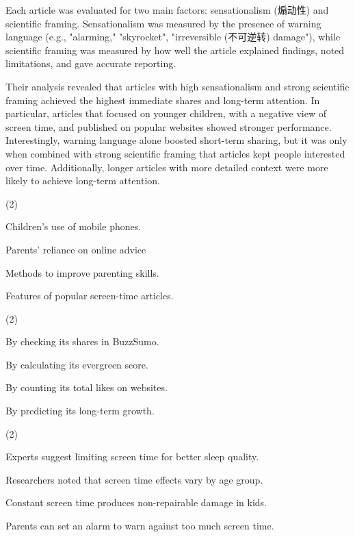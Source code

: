 \documentclass{英语试卷}
\begin{document}
\par Each article was evaluated for two main factors: sensationalism (煽动性) and scientific framing. Sensationalism was measured by the presence of warning language (e.g., "alarming," "skyrocket", "irreversible (不可逆转) damage"), while scientific framing was measured by how well the article explained findings, noted limitations, and gave accurate reporting.\par
\par Their analysis revealed that articles with high sensationalism and strong scientific framing achieved the highest immediate shares and long-term attention. In particular, articles that focused on younger children, with a negative view of screen time, and published on popular websites showed stronger performance. Interestingly, warning language alone boosted short-term sharing, but it was only when combined with strong scientific framing that articles kept people interested over time. Additionally, longer articles with more detailed context were more likely to achieve long-term attention.\par
{}
\begin{choices}(2)
  \item Children's use of mobile phones.
  \item Parents' reliance on online advice
  \item Methods to improve parenting skills.
  \item Features of popular screen-time articles.
\end{choices}
\begin{choices}(2)
  \item By checking its shares in BuzzSumo.
  \item By calculating its evergreen score.
  \item By counting its total likes on websites.
  \item By predicting its long-term growth.
\end{choices}
\begin{choices}(2)
  \item Experts suggest limiting screen time for better sleep quality.
  \item Researchers noted that screen time effects vary by age group.
  \item Constant screen time produces non-repairable damage in kids.
  \item Parents can set an alarm to warn against too much screen time.
\end{choices}
\end{document}

